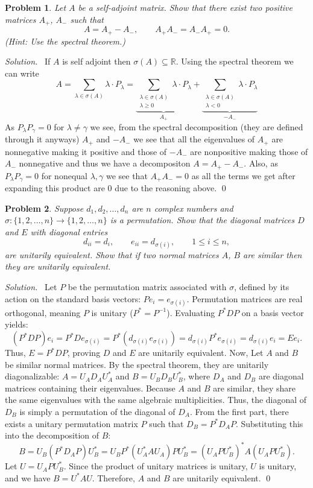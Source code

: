 \documentclass[12pt,a4paper]{article}
\newenvironment{solution}{%
  \par\noindent\textit{Solution.}\ }{\qed}
\theoremstyle{problemstyle}
\newtheorem{problem}{Problem}[section]
\def\bR{\mathbb{R}}
\begin{document}
\begin{problem}\label{prob:3-6}
Let $A$ be a self-adjoint matrix. Show that there exist two positive matrices $A_+$, $A_-$ such that
\[
A = A_+ - A_-, \qquad A_+ A_- = A_- A_+ = 0.
\]
(\textit{Hint}: Use the spectral theorem.)
\end{problem}
\begin{solution}
    If $A$ is self adjoint then $\sigma(A)\subseteq\bR$. Using the spectral theorem we can write
	\[
	A = \sum_{\lambda\in\sigma(A)}\lambda\cdot P_{\lambda}=\underbrace{\sum_{\substack{\lambda\in\sigma(A)\\ \lambda\geq 0}}\lambda\cdot P_{\lambda}}_{A_+}+\underbrace{\sum_{\substack{\lambda\in\sigma(A)\\ \lambda<0}}\lambda\cdot P_{\lambda}}_{-A_-}
	\]
As $P_{\lambda}P_{\gamma}=0$ for $\lambda\neq\gamma$ we see, from the spectral decomposition (they are defined through it anyways) $A_+$ and $-A_-$ we see that all the eigenvalues of $A_+$ are nonnegative making it positive and those of $-A_-$ are nonpositive making those of $A_-$ nonnegative and thus we have a decompositon $A=A_+-A_-$. Also, as $P_\lambda P_\gamma=0$ for nonequal $\lambda,\gamma$ we see that $A_+A_-=0$ as all the terms we get after expanding this product are $0$ due to the reasoning above. 
\end{solution}

\begin{problem}\label{prob:3-7}
Suppose $d_1, d_2, \ldots, d_n$ are $n$ complex numbers and $\sigma : \{1, 2, \ldots, n\} \to \{1, 2, \ldots, n\}$ is a permutation. Show that the diagonal matrices $D$ and $E$ with diagonal entries
\[
d_{ii} = d_i, \qquad e_{ii} = d_{\sigma(i)}, \qquad 1 \leq i \leq n,
\]
are unitarily equivalent. Show that if two normal matrices $A$, $B$ are similar then they are unitarily equivalent.
\end{problem}
\begin{solution}
    Let $P$ be the permutation matrix associated with $\sigma$, defined by its action on the standard basis vectors: $P e_i = e_{\sigma(i)}$. Permutation matrices are real orthogonal, meaning $P$ is unitary ($P^* = P^{-1}$). Evaluating $P^* D P$ on a basis vector yields:
\[ (P^* D P) e_i = P^* D e_{\sigma(i)} = P^* (d_{\sigma(i)} e_{\sigma(i)}) = d_{\sigma(i)} P^* e_{\sigma(i)} = d_{\sigma(i)} e_i = E e_i. \]
Thus, $E = P^* D P$, proving $D$ and $E$ are unitarily equivalent. Now, Let $A$ and $B$ be similar normal matrices. By the spectral theorem, they are unitarily diagonalizable: $A = U_A D_A U_A^*$ and $B = U_B D_B U_B^*$, where $D_A$ and $D_B$ are diagonal matrices containing their eigenvalues. Because $A$ and $B$ are similar, they share the same eigenvalues with the same algebraic multiplicities. Thus, the diagonal of $D_B$ is simply a permutation of the diagonal of $D_A$. From the first part, there exists a unitary permutation matrix $P$ such that $D_B = P^* D_A P$. Substituting this into the decomposition of $B$:
\[ B = U_B (P^* D_A P) U_B^* = U_B P^* (U_A^* A U_A) P U_B^* = (U_A P U_B^*)^* A (U_A P U_B^*). \]
Let $U = U_A P U_B^*$. Since the product of unitary matrices is unitary, $U$ is unitary, and we have $B = U^* A U$. Therefore, $A$ and $B$ are unitarily equivalent.
\end{solution}
\end{document}
